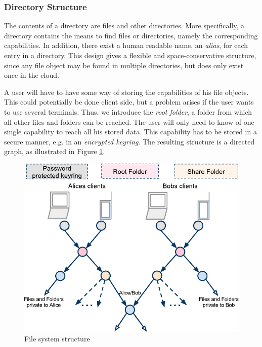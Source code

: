 \documentclass[pdftex,english,10pt,b5paper,twoside]{book}
\begin{document}
\subsubsection{Directory Structure}

The contents of a directory are files and other directories. More specifically,
a directory contains the means to find files or directories, namely the
corresponding capabilities. In addition, there exist a human readable name, an
\emph{alias}, for each entry in a directory. This design gives a flexible and
space-conservative structure, since any file object may be found in multiple
directories, but does only exist once in the cloud.

A user will have to have some way of storing the capabilities of his file
objects. This could potentially be done client side, but a problem arises if
the user wants to use several terminals. Thus, we introduce the \emph{root
folder}, a folder from which all other files and folders can be reached. The
user will only need to know of one single capability to reach all his stored
data. This capability has to be stored in a secure manner, e.g. in an
\emph{encrypted keyring}. The resulting structure is a directed graph, as
illustrated in Figure \ref{fig:AS:filesystem}.

\begin{figure}[h!]
    \centering
    \includegraphics[width=\columnwidth]{ArchitectureFileSystem.pdf}
    \caption{File system structure}
    \label{fig:AS:filesystem}
\end{figure}
\end{document}
